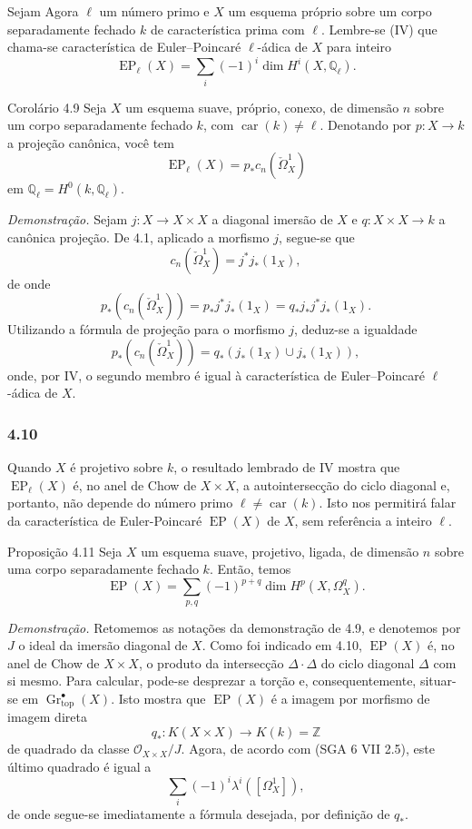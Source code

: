 Sejam Agora $\ell$ um número primo e $X$ um esquema próprio sobre um corpo separadamente fechado $k$ de característica prima com $\ell$. Lembre-se (IV) que chama-se característica de Euler--Poincaré $\ell$-ádica de $X$ para inteiro
\[
\operatorname{EP}_\ell(X)=\sum_i(-1)^i\dim H^i(X,\mathbb Q_\ell).
\]

\begin{statement}{Corolário 4.9}
Seja $X$ um esquema suave, próprio, conexo, de dimensão $n$ sobre um corpo separadamente fechado $k$, com $\operatorname{car}(k)\ne\ell$. Denotando por $p:X\to k$ a projeção canônica, você tem
\[
\operatorname{EP}_\ell(X)=p_*c_n(\check\Omega^1_X)
\]
em $\mathbb Q_\ell=H^0(k,\mathbb Q_\ell)$.
\end{statement}

\emph{Demonstração.} Sejam $j:X\to X\times X$ a diagonal imersão de $X$ e $q:X\times X\to k$ a canônica projeção. De 4.1, aplicado a morfismo $j$, segue-se que
\[
c_n(\check\Omega^1_X)=j^*j_*(1_X),
\]
de onde
\[
p_*(c_n(\check\Omega^1_X))=p_*j^*j_*(1_X)=q_*j_*j^*j_*(1_X).
\]
Utilizando a fórmula de projeção para o morfismo $j$, deduz-se a igualdade
\[
p_*(c_n(\check\Omega^1_X))=q_*(j_*(1_X)\cup j_*(1_X)),
\]
onde, por IV, o segundo membro é igual à característica de Euler--Poincaré $\ell$-ádica de $X$.

\subsubsection*{4.10}
Quando $X$ é projetivo sobre $k$, o resultado lembrado de IV mostra que $\operatorname{EP}_\ell(X)$ é, no anel de Chow de $X\times X$, a autointersecção do ciclo diagonal e, portanto, não depende do número primo $\ell\ne\operatorname{car}(k)$. Isto nos permitirá falar da característica de Euler-Poincaré $\operatorname{EP}(X)$ de $X$, sem referência a inteiro $\ell$.

\begin{statement}{Proposição 4.11}
Seja $X$ um esquema suave, projetivo, ligada, de dimensão $n$ sobre uma corpo separadamente fechado $k$. Então, temos
\[
\operatorname{EP}(X)=\sum_{p,q}(-1)^{p+q}\dim H^p(X,\Omega_X^q).
\]
\end{statement}

\emph{Demonstração.} Retomemos as notações da demonstração de 4.9, e denotemos por $J$ o ideal da imersão diagonal de $X$. Como foi indicado em 4.10, $\operatorname{EP}(X)$ é, no anel de Chow de $X\times X$, o produto da intersecção $\Delta\cdot\Delta$ do ciclo diagonal $\Delta$ com si mesmo. Para calcular, pode-se desprezar a torção e, consequentemente, situar-se em $\operatorname{Gr}_{\mathrm{top}}^\bullet(X)$. Isto mostra que $\operatorname{EP}(X)$ é a imagem por morfismo de imagem direta
\[
q_*:K(X\times X)\to K(k)=\mathbb Z
\]
de quadrado da classe $\mathcal O_{X\times X}/J$. Agora, de acordo com (SGA 6 VII 2.5), este último quadrado é igual a
\[
\sum_i(-1)^i\lambda^i([\Omega_X^1]),
\]
de onde segue-se imediatamente a fórmula desejada, por definição de $q_*$.
